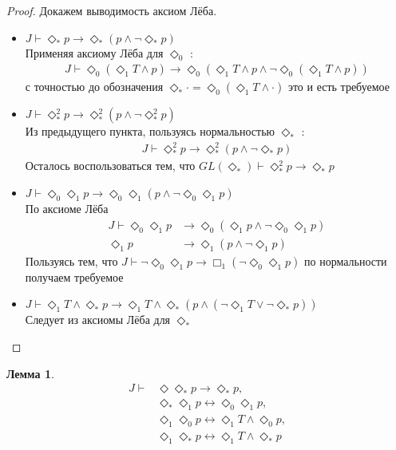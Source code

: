 \documentclass[12pt,a4paper,oneside]{article}
\newtheorem{lemma}{Лемма}
\begin{document}
  \begin{proof}
    Докажем выводимость аксиом Лёба.
    \begin{itemize}
      \item $J \vdash  \Diamond_* p \rightarrow  \Diamond_* (p \wedge  \neg \Diamond_* p)$ \\
            Применяя аксиому Лёба для $\Diamond_0 $ :
      \begin{align*}
        J \vdash  \Diamond_0 (\Diamond_1 T \wedge  p) \rightarrow  \Diamond_0 (\Diamond_1 T \wedge 
        p \wedge  \neg \Diamond_0 (\Diamond_1 T \wedge  p))
      \end{align*}
      с точностью до обозначения $\Diamond_* \cdot = \Diamond_0 (\Diamond_1 T \wedge  \cdot)$ это и
      есть требуемое
      \item $J \vdash  \Diamond_* ^2 p \rightarrow  \Diamond_* ^2(p \wedge  \neg \Diamond_* ^2 p)$
            \\ Из предыдущего пункта, пользуясь нормальностью $\Diamond_* $ :
      \begin{align*}
        J \vdash  \Diamond_* ^2 p \rightarrow  \Diamond_* ^2(p \wedge  \neg \Diamond_* p)
      \end{align*}
      Осталось воспользоваться тем, что $GL(\Diamond_* ) \vdash  \Diamond_* ^2 p \rightarrow 
      \Diamond_* p$ 
      \item $J \vdash  \Diamond_0 \Diamond_1 p \rightarrow  \Diamond_0 \Diamond_1 (p \wedge 
            \neg \Diamond_0 \Diamond_1 p)$ \\ По аксиоме Лёба
      \begin{align*}
        J \vdash  \Diamond_0 \Diamond_1 p &\rightarrow  \Diamond_0 (\Diamond_1 p \wedge 
        \neg \Diamond_0 \Diamond_1 p)\\
        \Diamond_1 p &\rightarrow  \Diamond_1 (p \wedge  \neg \Diamond_1 p)
      \end{align*}
      Пользуясь тем, что $J \vdash  \neg \Diamond_0 \Diamond_1 p \rightarrow 
      \Box_1 (\neg \Diamond_0 \Diamond_1 p)$ по нормальности получаем требуемое
      \item $J \vdash  \Diamond_1 T \wedge  \Diamond_* p \rightarrow  \Diamond_1 T \wedge 
            \Diamond_* (p \wedge  (\neg \Diamond_1 T \vee  \neg \Diamond_* p))$ \\ Следует из
            аксиомы Лёба для $\Diamond_* $ 
    \end{itemize}
  \end{proof}

  \begin{lemma}
    \begin{align*}
      J \vdash  &\Diamond \Diamond_* p \rightarrow  \Diamond_* p,\\
      &\Diamond_* \Diamond_1 p \leftrightarrow  \Diamond_0 \Diamond_1 p,\\
      &\Diamond_1 \Diamond_0 p \leftrightarrow  \Diamond_1 T \wedge  \Diamond_0 p,\\
      &\Diamond_1 \Diamond_* p \leftrightarrow  \Diamond_1 T \wedge  \Diamond_* p
    \end{align*}
  \end{lemma}
\end{document}
